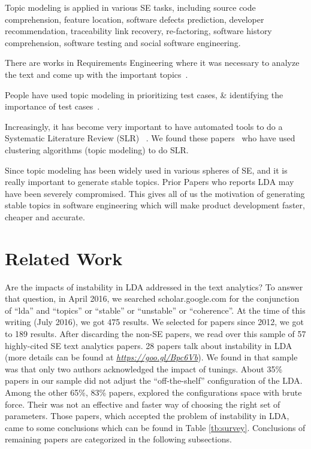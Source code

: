 \documentclass[conference]{IEEEtran}
\theoremstyle{break}
\begin{document}
\begin{compactitem}
    \item Topic modeling is applied in various SE tasks, including source code comprehension, feature location, software defects prediction, developer recommendation, traceability link recovery, re-factoring, software history comprehension, software testing and social software engineering.
    \item There are works in Requirements Engineering where it was necessary to analyze the text and come up with the important topics~\cite{asuncion2010software, thomas2014studying, massey2013automated}.
    \item People have used topic modeling in prioritizing test cases, \& identifying the importance of test cases~\cite{hemmati2015prioritizing, zhang2015inferring, yang2015predicting}.
    \item Increasingly, it has become very important to have automated tools to do a Systematic Literature Review (SLR) ~\cite{tsafnat2014systematic}. We found these papers~\cite{restificar2012inferring,alreview,marshall2013tools} who have used clustering algorithms (topic modeling) to do SLR.
\end{compactitem}

Since topic modeling has been widely used in various spheres of SE, and it is really important to generate stable topics. Prior Papers who reports LDA may have been severely compromised. This gives all of us the motivation of generating stable topics in software engineering which will make product development faster, cheaper and accurate.

\section{Related Work}

Are the impacts of instability in LDA addressed in the text analytics? To answer that question, in April 2016, we searched scholar.google.com for the conjunction of “lda” and “topics” or “stable” or “unstable” or “coherence”. At the time of this writing (July 2016), we got 475 results. We selected for papers since 2012, we got to 189 results. After discarding the non-SE papers, we read over this sample of 57 highly-cited SE text analytics papers. 28 papers talk about instability in LDA (more details can be found at \href{https://goo.gl/Bpc6Vb}{\textit{https://goo.gl/Bpc6Vb}}). We found in that sample was that only two authors acknowledged the impact of tunings. About 35\% papers in our sample did not adjust the “off-the-shelf” configuration of the LDA. Among the other 65\%, 83\% papers, explored the configurations space with brute force. Their was not an effective and faster way of choosing the right set of parameters. Those papers, which accepted the problem of instability in LDA, came to some conclusions which can be found in Table \ref{tb:survey}. Conclusions of remaining papers are categorized in the following subsections.
\end{document}
